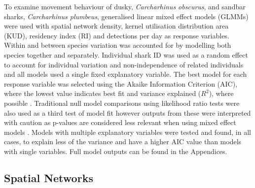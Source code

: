 \documentclass[11pt,a4paper]{article}
\begin{document}
	To examine movement behaviour of dusky, \textit{Carcharhinus obscurus}, and sandbar sharks, \textit{Carcharhinus plumbeus}, generalised linear mixed effect models (GLMMs) were used with spatial network density, kernel utilisation distribution area (KUD), residency index (RI) and detections per day as response variables. Within and between species variation was accounted for by modelling both species together and separately. Individual shark ID was used as a random effect to account for individual variation and non-independence of related individuals and all models used a single fixed explanatory variable. The best model for each response variable was selected using the Akaike Information Criterion (AIC), where the lowest value indicates best fit \citep{Bolker2009} and variance explained ($R^2$), where possible \citep{Nakagawa2013}. Traditional null model comparisons using likelihood ratio tests were also used as a third test of model fit however outputs from these were interpreted with caution as p-values are considered less relevant when using mixed effect models \citep{Posada2004}. Models with multiple explanatory variables were tested and found, in all cases, to explain less of the variance and have a higher AIC value than models with single variables. Full model outputs can be found in the Appendices. 
	
	
	\subsection{Spatial Networks}
	
\end{document}
